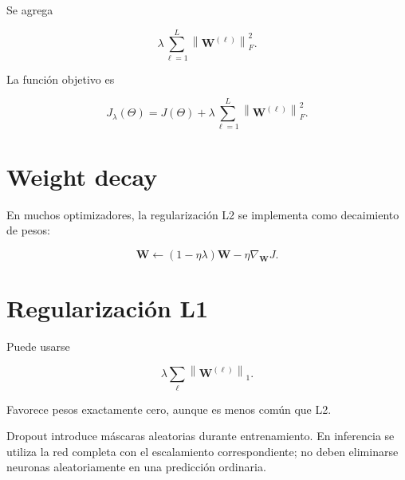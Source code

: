 \documentclass[
  spanish,
  10.5pt,
  letterpaper,
  DIV=11,
  numbers=noendperiod,
  oneside,
  open=any]{scrreprt}
\theoremstyle{definition}
\theoremstyle{definition}
\theoremstyle{plain}
\theoremstyle{remark}
\begin{document}

Se agrega

\[
\lambda
\sum_{\ell=1}^{L}
\left\|
\mathbf{W}^{(\ell)}
\right\|_F^2.
\]

La función objetivo es

\[
J_{\lambda}(\Theta)
=
J(\Theta)
+
\lambda
\sum_{\ell=1}^{L}
\left\|
\mathbf{W}^{(\ell)}
\right\|_F^2.
\]

\section*{Weight decay}\label{weight-decay-1}


En muchos optimizadores, la regularización L2 se implementa como
decaimiento de pesos:

\[
\mathbf{W}
\leftarrow
(1-\eta\lambda)\mathbf{W}
-
\eta\nabla_{\mathbf{W}}J.
\]

\section*{Regularización L1}\label{regularizaciuxf3n-l1-1}


Puede usarse

\[
\lambda
\sum_{\ell}
\left\|
\mathbf{W}^{(\ell)}
\right\|_1.
\]

Favorece pesos exactamente cero, aunque es menos común que L2.

\begin{tcolorbox}[enhanced jigsaw, arc=.35mm, bottomrule=.15mm, bottomtitle=1mm, breakable, colback=white, colbacktitle=quarto-callout-note-color!10!white, colframe=quarto-callout-note-color-frame, coltitle=black, left=2mm, leftrule=.75mm, opacityback=0, opacitybacktitle=0.6, rightrule=.15mm, title=\textcolor{quarto-callout-note-color}{\faInfo}\hspace{0.5em}{Dropout durante entrenamiento y predicción}, titlerule=0mm, toprule=.15mm, toptitle=1mm]

Dropout introduce máscaras aleatorias durante entrenamiento. En
inferencia se utiliza la red completa con el escalamiento
correspondiente; no deben eliminarse neuronas aleatoriamente en una
predicción ordinaria.

\end{tcolorbox}
\end{document}
